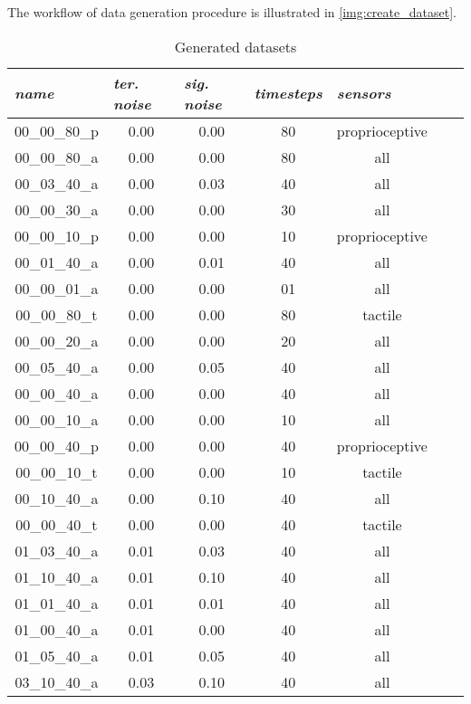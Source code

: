 The workflow of data generation procedure is illustrated in \cref{img:create_dataset}. 

\begin{table}[H]
\centering
\caption{Generated datasets}
\label{tab:generated_datasets}
\begin{tabular}{|c|c|c|c|c|c|c|}
\hline
\multicolumn{1}{|l|}{\textit{name}} & \multicolumn{1}{l|}{\textit{ter. noise}} & \multicolumn{1}{l|}{\textit{sig. noise}} & \multicolumn{1}{l|}{\textit{timesteps}} & \multicolumn{1}{l|}{\textit{sensors}} \\ \hline
00\_00\_80\_p	& 0.00	& 0.00	& 80	& proprioceptive	 \\ \hline
00\_00\_80\_a	& 0.00	& 0.00	& 80	& all	 \\ \hline
00\_03\_40\_a	& 0.00	& 0.03	& 40	& all	 \\ \hline
00\_00\_30\_a	& 0.00	& 0.00	& 30	& all	 \\ \hline
00\_00\_10\_p	& 0.00	& 0.00	& 10	& proprioceptive	 \\ \hline
00\_01\_40\_a	& 0.00	& 0.01	& 40	& all	 \\ \hline
00\_00\_01\_a	& 0.00	& 0.00	& 01	& all	 \\ \hline
00\_00\_80\_t	& 0.00	& 0.00	& 80	& tactile	 \\ \hline
00\_00\_20\_a	& 0.00	& 0.00	& 20	& all	 \\ \hline
00\_05\_40\_a	& 0.00	& 0.05	& 40	& all	 \\ \hline
00\_00\_40\_a	& 0.00	& 0.00	& 40	& all	 \\ \hline
00\_00\_10\_a	& 0.00	& 0.00	& 10	& all	 \\ \hline
00\_00\_40\_p	& 0.00	& 0.00	& 40	& proprioceptive	 \\ \hline
00\_00\_10\_t	& 0.00	& 0.00	& 10	& tactile	 \\ \hline
00\_10\_40\_a	& 0.00	& 0.10	& 40	& all	 \\ \hline
00\_00\_40\_t	& 0.00	& 0.00	& 40	& tactile	 \\ \hline
01\_03\_40\_a	& 0.01	& 0.03	& 40	& all	 \\ \hline
01\_10\_40\_a	& 0.01	& 0.10	& 40	& all	 \\ \hline
01\_01\_40\_a	& 0.01	& 0.01	& 40	& all	 \\ \hline
01\_00\_40\_a	& 0.01	& 0.00	& 40	& all	 \\ \hline
01\_05\_40\_a	& 0.01	& 0.05	& 40	& all	 \\ \hline
03\_10\_40\_a	& 0.03	& 0.10	& 40	& all	 \\ \hline

\end{tabular}
\end{table}
